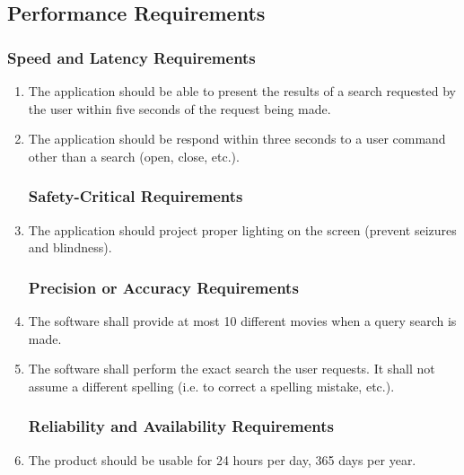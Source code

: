 \documentclass[]{article}
\begin{document}

\subsection{Performance Requirements}
\label{sub:performance_requirements}

\subsubsection{Speed and Latency Requirements}
\label{ssub:speed_and_latency_requirements}
\begin{enumerate}[{PR}1. ]
	\item The application should be able to present the results of a search requested by the user within five seconds of the request being made.
	\item The application should be respond within three seconds to a user command other than a search (open, close, etc.).

\subsubsection{Safety-Critical Requirements}
\label{ssub:safety_critical_requirements}
	\item The application should project proper lighting on the screen (prevent seizures and blindness).

\subsubsection{Precision or Accuracy Requirements}
\label{ssub:precision_or_accuracy_requirements}
	\item The software shall provide at most 10 different movies when a query search is made.
	\item The software shall perform the exact search the user requests. It shall not assume a different spelling (i.e. to correct a spelling mistake, etc.).


\subsubsection{Reliability and Availability Requirements}
\label{ssub:reliability_and_availability_requirements}
	\item The product should be usable for 24 hours per day, 365 days per year.


\end{enumerate}
\end{document}
